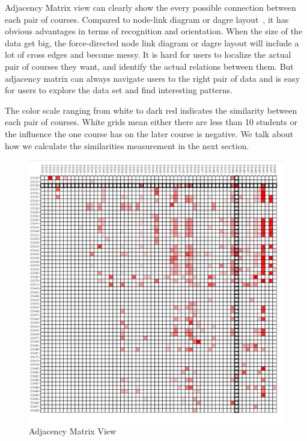 Adjacency Matrix view can clearly show the every possible connection between each pair of courses. Compared to node-link diagram or dagre layout~\cite{Bostock:2011:DDD:2068462.2068631}, it has obvious advantages in terms of recognition and orientation. When the size of the data get big, the force-directed node link diagram or dagre layout will include a lot of cross edges and become messy. It is hard for users to localize the actual pair of courses they want, and identify the actual relations between them. But adjacency matrix can always navigate users to the right pair of data and is easy for users to explore the data set and find interesting patterns. 

The color scale ranging from white to dark red indicates the similarity between each pair of courses. White grids mean either there are less than 10 students or the influence the one course has on the later course is negative. We talk about how we calculate the similarities measurement in the next section.
\begin{figure}[h]
	\centering %
	\includegraphics[width=\columnwidth]{figs/matrix} 
	\caption{Adjacency Matrix View}
	\label{fig:sample}
\end{figure}


